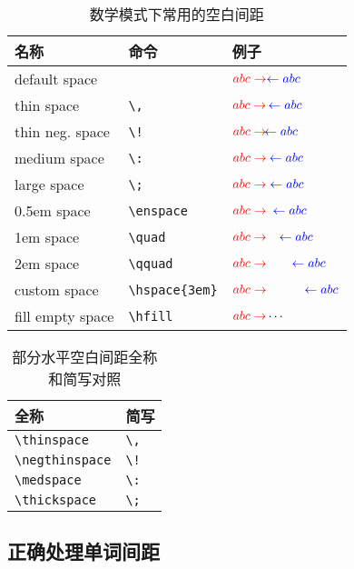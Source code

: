 \begin{table}[!h]
    \newcommand\rlArrow[1]{\ensuremath{\color{red}{abc \rightarrow} #1 \color{blue}{\leftarrow abc}}}
    \centering
    \caption{数学模式下常用的空白间距\protect\footnotemark}
    \begin{tabular}{lll}
        \toprule[2pt]
        名称 & 命令 & 例子\\
        \midrule
        default space & & \rlArrow{}\\
        thin space & \verb|\,| & \rlArrow{\,}\\
        thin neg. space & \verb|\!| & \rlArrow{\!}\\
        medium space & \verb|\:| & \rlArrow{\:}\\
        large space & \verb|\;| & \rlArrow{\;}\\
        0.5em space & \verb|\enspace| & \rlArrow{\enspace}\\
        1em space & \verb|\quad| & \rlArrow{\quad}\\
        2em space & \verb|\qquad| & \rlArrow{\qquad}\\
        custom space & \verb|\hspace{3em}| & \rlArrow{\hspace{3em}}\\
        fill empty space & \verb|\hfill| & $\color{red}{abc \rightarrow} \color{black}\cdots$\\
        \bottomrule
    \end{tabular}
\end{table}

\begin{table}[h]
    \centering
    \begin{tabular}{ll}
        \toprule
        全称 & 简写 \\
        \midrule
        \verb|\thinspace| & \verb|\,| \\
        \verb|\negthinspace| & \verb|\!| \\
        \verb|\medspace| & \verb|\:|  \\
        \verb|\thickspace| & \verb|\;|\\
        \bottomrule
    \end{tabular}
    \caption{部分水平空白间距全称和简写对照}
\end{table}



\subsection{正确处理单词间距}

